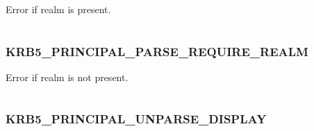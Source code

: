 \documentclass[letterpaper,10pt,english]{sphinxmanual}
\begin{document}
Error if realm is present.

\begin{tabulary}{\linewidth}{|L|L|}
\hline

 & 
\\\hline
\end{tabulary}



\subsubsection{KRB5\_PRINCIPAL\_PARSE\_REQUIRE\_REALM}
\label{appdev/refs/macros/KRB5_PRINCIPAL_PARSE_REQUIRE_REALM::doc}\label{appdev/refs/macros/KRB5_PRINCIPAL_PARSE_REQUIRE_REALM:krb5-principal-parse-require-realm}\label{appdev/refs/macros/KRB5_PRINCIPAL_PARSE_REQUIRE_REALM:krb5-principal-parse-require-realm-data}

\begin{fulllineitems}
\label{appdev/refs/macros/KRB5_PRINCIPAL_PARSE_REQUIRE_REALM:KRB5_PRINCIPAL_PARSE_REQUIRE_REALM}
\end{fulllineitems}


Error if realm is not present.

\begin{tabulary}{\linewidth}{|L|L|}
\hline

 & 
\\\hline
\end{tabulary}



\subsubsection{KRB5\_PRINCIPAL\_UNPARSE\_DISPLAY}
\label{appdev/refs/macros/KRB5_PRINCIPAL_UNPARSE_DISPLAY::doc}\label{appdev/refs/macros/KRB5_PRINCIPAL_UNPARSE_DISPLAY:krb5-principal-unparse-display-data}\label{appdev/refs/macros/KRB5_PRINCIPAL_UNPARSE_DISPLAY:krb5-principal-unparse-display}

\begin{fulllineitems}
\label{appdev/refs/macros/KRB5_PRINCIPAL_UNPARSE_DISPLAY:KRB5_PRINCIPAL_UNPARSE_DISPLAY}
\end{fulllineitems}
\end{document}

